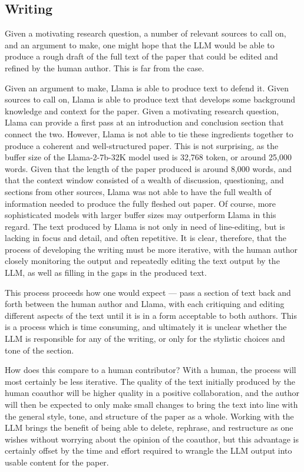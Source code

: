 \subsection{Writing}
Given a motivating research question, a number of relevant sources to call on,
and an argument to make, one might hope that the LLM would be able to produce
a rough draft of the full text of the paper that could be edited and refined by
the human author. This is far from the case.

Given an argument to make, Llama is able to produce text to defend it. Given 
sources to call on, Llama is able to produce text that develops some background
knowledge and context for the paper. Given a motivating research question, Llama
can provide a first pass at an introduction and conclusion section that connect
the two. However, Llama is not able to tie these ingredients together to produce
a coherent and well-structured paper. This is not surprising, as the buffer size
of the Llama-2-7b-32K model used is 32,768 token, or around 25,000 words. Given
that the length of the paper produced is around 8,000 words, and that the
context window consisted of a wealth of discussion, questioning, and sections 
from other sources, Llama was not able to have the full wealth of information
needed to produce the fully fleshed out paper. Of course, more sophisticated 
models with larger buffer sizes may outperform Llama in this regard. The text
produced by Llama is not only in need of line-editing, but is lacking in focus
and detail, and often repetitive. It is clear, therefore, that the process of
developing the writing must be more iterative, with the human author closely
monitoring the output and repeatedly editing the text output by the LLM, as well
as filling in the gaps in the produced text. 

This process proceeds how one would expect — pass a section of text back and
forth between the human author and Llama, with each critiquing and editing
different aspects of the text until it is in a form acceptable to both authors.
This is a process which is time consuming, and ultimately it is unclear whether
the LLM is responsible for any of the writing, or only for the stylistic choices
and tone of the section. 

How does this compare to a human contributor? With a human, the process will 
most certainly be less iterative. The quality of the text initially produced by
the human coauthor will be higher quality in a positive collaboration, and the
author will then be expected to only make small changes to bring the text into
line with the general style, tone, and structure of the paper as a whole.
Working with the LLM brings the benefit of being able to delete, rephrase, and 
restructure as one wishes without worrying about the opinion of the coauthor,
but this advantage is certainly offset by the time and effort required to 
wrangle the LLM output into usable content for the paper.

